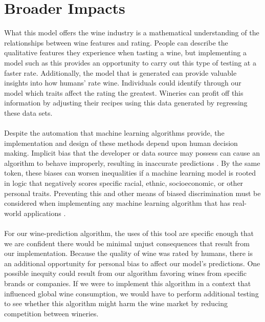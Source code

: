 
\section{Broader Impacts}
\label{sec:impacts}

What this model offers the wine industry is a mathematical understanding of the relationships between wine features and rating. People can describe the qualitative features they experience when tasting a wine, but implementing a model such as this provides an opportunity to carry out this type of testing at a faster rate. Additionally, the model that is generated can provide valuable insights into how humans’ rate wine. Individuals could identify through our model which traits affect the rating the greatest. Wineries can profit off this information by adjusting their recipes using this data generated by regressing these data sets. \\\\
Despite the automation that machine learning algorithms provide, the implementation and design of these methods depend upon human decision making. Implicit bias that the developer or data source may possess can cause an algorithm to behave improperly, resulting in inaccurate predictions \cite{mehrabi2019survey}. By the same token, these biases can worsen inequalities if a machine learning model is rooted in logic that negatively scores specific racial, ethnic, socioeconomic, or other personal traits. Preventing this and other means of biased discrimination must be considered when implementing any machine learning algorithm that has real-world applications \cite{inproceedings}. \\\\
For our wine-prediction algorithm, the uses of this tool are specific enough that we are confident there would be minimal unjust consequences that result from our implementation. Because the quality of wine was rated by humans, there is an additional opportunity for personal bias to affect our model’s predictions. One possible inequity could result from our algorithm favoring wines from specific brands or companies. If we were to implement this algorithm in a context that influenced global wine consumption, we would have to perform additional testing to see whether this algorithm might harm the wine market by reducing competition between wineries. 
